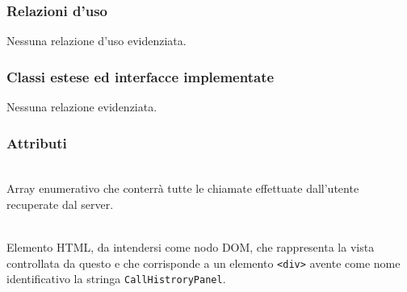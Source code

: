\subsubsection*{Relazioni d'uso}
Nessuna relazione d'uso evidenziata.

\subsubsection*{Classi estese ed interfacce implementate}
Nessuna relazione evidenziata.

\subsubsection*{Attributi}
\begin{description}
  \item{}\\
  Array enumerativo che conterrà tutte le chiamate effettuate dall'utente recuperate dal server.
  \item{}\\
  Elemento HTML, da intendersi come nodo DOM, che rappresenta la vista controllata da questo  e che corrisponde a un elemento \verb'<div>' avente come nome identificativo la stringa \verb'CallHistroryPanel'.
\end{description}

